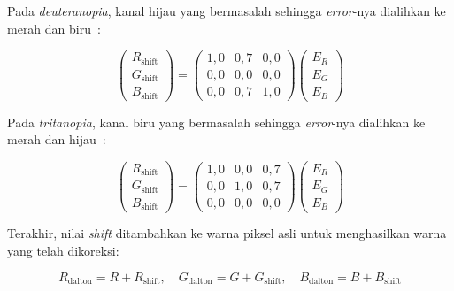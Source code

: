 Pada \textit{deuteranopia}, kanal hijau yang bermasalah sehingga \textit{error}-nya dialihkan ke merah dan biru~\parencite{muhammad2020analysis}:

\begin{equation}
  \begin{pmatrix} R_{\text{shift}} \\ G_{\text{shift}} \\ B_{\text{shift}} \end{pmatrix}
  =
  \begin{pmatrix} 1{,}0 & 0{,}7 & 0{,}0 \\ 0{,}0 & 0{,}0 & 0{,}0 \\ 0{,}0 & 0{,}7 & 1{,}0 \end{pmatrix}
  \begin{pmatrix} E_R \\ E_G \\ E_B \end{pmatrix}
  \label{eq:shift-deuteranopia}
\end{equation}

Pada \textit{tritanopia}, kanal biru yang bermasalah sehingga \textit{error}-nya dialihkan ke merah dan hijau~\parencite{schmitz_colorblindness}:

\begin{equation}
  \begin{pmatrix} R_{\text{shift}} \\ G_{\text{shift}} \\ B_{\text{shift}} \end{pmatrix}
  =
  \begin{pmatrix} 1{,}0 & 0{,}0 & 0{,}7 \\ 0{,}0 & 1{,}0 & 0{,}7 \\ 0{,}0 & 0{,}0 & 0{,}0 \end{pmatrix}
  \begin{pmatrix} E_R \\ E_G \\ E_B \end{pmatrix}
  \label{eq:shift-tritanopia}
\end{equation}

Terakhir, nilai \textit{shift} ditambahkan ke warna piksel asli untuk menghasilkan warna yang telah dikoreksi:

\begin{equation}
  R_{\text{dalton}} = R + R_{\text{shift}}, \quad
  G_{\text{dalton}} = G + G_{\text{shift}}, \quad
  B_{\text{dalton}} = B + B_{\text{shift}}
  \label{eq:dalton-result}
\end{equation}


